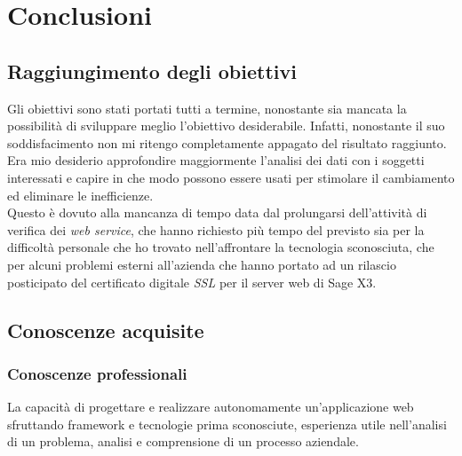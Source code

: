 

\chapter{Conclusioni}
\label{cap:conclusioni}



\section{Raggiungimento degli obiettivi}

Gli obiettivi sono stati portati tutti a termine, nonostante sia mancata la possibilità di sviluppare meglio l'obiettivo desiderabile.
Infatti, nonostante il suo soddisfacimento non mi ritengo completamente appagato del risultato raggiunto.\\
Era mio desiderio approfondire maggiormente l'analisi dei dati con i soggetti interessati e capire in che modo possono essere usati per stimolare il cambiamento ed eliminare le inefficienze.\\
Questo è dovuto alla mancanza di tempo data dal prolungarsi dell'attività di verifica dei \textit{web service}, che hanno richiesto più tempo del previsto sia per la difficoltà personale che ho trovato nell'affrontare la tecnologia sconosciuta, che per alcuni problemi esterni all'azienda che hanno portato ad un rilascio posticipato del certificato digitale \textit{SSL} per il server web di Sage X3.




\section{Conoscenze acquisite}

\subsection{Conoscenze professionali}

La capacità di progettare e realizzare autonomamente un'applicazione web sfruttando
framework e tecnologie prima sconosciute, esperienza utile nell'analisi di un problema,
analisi e comprensione di un processo aziendale.

